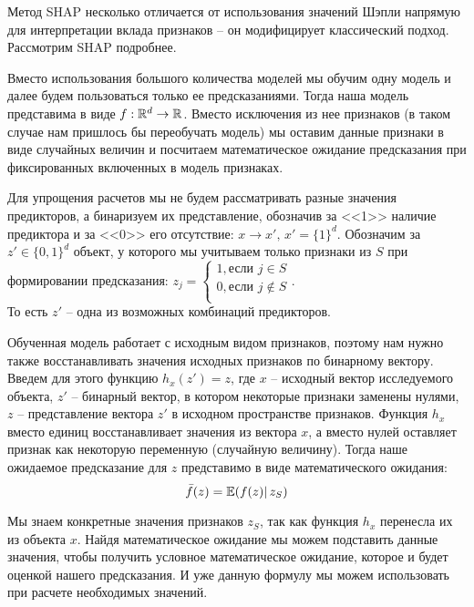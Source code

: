 Метод SHAP несколько отличается от использования значений Шэпли напрямую для интерпретации вклада признаков -- он модифицирует классический подход. Рассмотрим SHAP подробнее.

Вместо использования большого количества моделей мы обучим одну модель и далее будем пользоваться только ее предсказаниями. Тогда наша модель представима в виде $f: \mathbb{R}^d \rightarrow \mathbb{R}$. Вместо исключения из нее признаков (в таком случае нам пришлось бы переобучать модель) мы оставим данные признаки в виде случайных величин и посчитаем математическое ожидание предсказания при фиксированных включенных в модель признаках.

Для упрощения расчетов мы не будем рассматривать разные значения предикторов, а бинаризуем их представление, обозначив за <<1>> наличие предиктора и за <<0>> его отсутствие: $x \rightarrow x', \, x' = \{1\}^d$. %
Обозначим за $z' \in \{0,1\}^d$ объект, у которого мы учитываем только признаки из $S$ при формировании предсказания:
$z_j =
\begin{cases}
1, \text{если $j \in S$}\\
0, \text{если $j \notin S$}\\
\end{cases}$.\\
То есть $z'$ -- одна из возможных комбинаций предикторов.

Обученная модель работает с исходным видом признаков, поэтому нам нужно также восстанавливать значения исходных признаков по бинарному вектору. Введем для этого функцию $h_x(z') = z$, где $x$ -- исходный вектор исследуемого объекта, $z'$ -- бинарный вектор, в котором некоторые признаки заменены нулями, $z$ -- представление вектора $z'$ в исходном пространстве признаков. Функция $h_x$ вместо единиц восстанавливает значения из вектора $x$, а вместо нулей оставляет признак как некоторую переменную (случайную величину).
Тогда наше ожидаемое предсказание для $z$ представимо в виде математического ожидания:
\[
\bar{f}(z) = \mathbb{E}(f(z)|\,z_S)
\]

Мы знаем конкретные значения признаков $z_S$, так как функция $h_x$ перенесла их из объекта $x$. Найдя математическое ожидание мы можем подставить данные значения, чтобы получить условное математическое ожидание, которое и будет оценкой нашего предсказания. И уже данную формулу мы можем использовать при расчете необходимых значений.%

